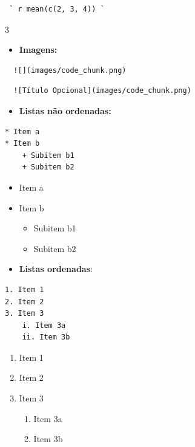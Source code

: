 \documentclass[]{book}
\providecommand{\tightlist}{%
  \setlength{\itemsep}{0pt}\setlength{\parskip}{0pt}}
\begin{document}
\begin{verbatim}
 ` r mean(c(2, 3, 4)) `
\end{verbatim}

3

\begin{itemize}
\tightlist
\item
  \textbf{Imagens:}
\end{itemize}

\begin{verbatim}
  ![](images/code_chunk.png)
\end{verbatim}

\begin{verbatim}
  ![Título Opcional](images/code_chunk.png)
\end{verbatim}

\begin{itemize}
\tightlist
\item
  \textbf{Listas não ordenadas:}
\end{itemize}

\begin{verbatim}
* Item a
* Item b
    + Subitem b1
    + Subitem b2
\end{verbatim}

\begin{itemize}
\tightlist
\item
  Item a
\item
  Item b

  \begin{itemize}
  \tightlist
  \item
    Subitem b1
  \item
    Subitem b2
  \end{itemize}
\item
  \textbf{Listas ordenadas}:
\end{itemize}

\begin{verbatim}
1. Item 1
2. Item 2
3. Item 3
    i. Item 3a
    ii. Item 3b
\end{verbatim}

\begin{enumerate}
\def\labelenumi{\arabic{enumi}.}
\tightlist
\item
  Item 1
\item
  Item 2
\item
  Item 3

  \begin{enumerate}
  \def\labelenumii{\roman{enumii}.}
  \tightlist
  \item
    Item 3a
  \item
    Item 3b
  \end{enumerate}
\end{enumerate}
\end{document}
